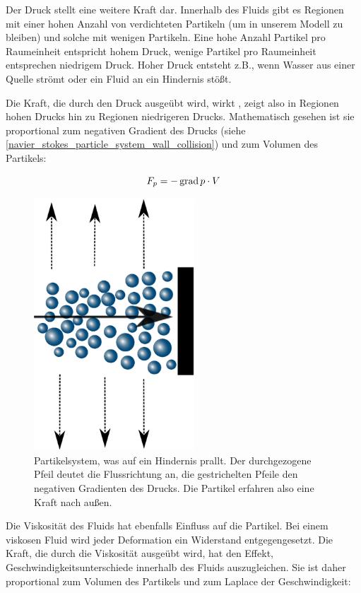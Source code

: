 Der Druck stellt eine weitere Kraft dar. Innerhalb des Fluids gibt es Regionen
mit einer hohen Anzahl von verdichteten Partikeln (um in unserem Modell zu
bleiben) und solche mit wenigen Partikeln. Eine hohe Anzahl Partikel pro
Raumeinheit entspricht hohem Druck, wenige Partikel pro Raumeinheit entsprechen
niedrigem Druck. Hoher Druck entsteht z.B., wenn Wasser aus einer Quelle strömt
oder ein Fluid an ein Hindernis stößt.

Die Kraft, die durch den Druck ausgeübt wird, wirkt
, zeigt also in Regionen hohen Drucks hin zu
Regionen niedrigeren Drucks. Mathematisch gesehen ist sie proportional zum
negativen Gradient des Drucks (siehe \autoref{navier_stokes_particle_system_wall_collision}) und zum Volumen des Partikels:

\begin{equation}
\label{navier_stokes_f_p}
F_p = -\operatorname*{grad} p \cdot V
\end{equation}

\begin{figure}[ht]
\includegraphics[width=6cm]{images/particle_system_wall_collision}
\caption{Partikelsystem, was auf ein Hindernis prallt. Der durchgezogene Pfeil deutet die Flussrichtung an, die gestrichelten Pfeile den negativen Gradienten des Drucks. Die Partikel erfahren also eine Kraft nach außen.}
\label{navier_stokes_particle_system_wall_collision}
\end{figure}

Die Viskosität des Fluids hat ebenfalls Einfluss auf die Partikel. Bei einem
viskosen Fluid wird jeder Deformation ein Widerstand entgegengesetzt. Die Kraft,
die durch die Viskosität ausgeübt wird, hat den Effekt,
Geschwindigkeitsunterschiede innerhalb des Fluids auszugleichen. Sie ist daher
proportional zum Volumen des Partikels und zum Laplace der Geschwindigkeit:

